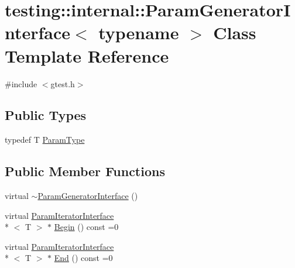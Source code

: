 \hypertarget{classtesting_1_1internal_1_1_param_generator_interface}{\section{testing\-:\-:internal\-:\-:Param\-Generator\-Interface$<$ typename $>$ Class Template Reference}
\label{classtesting_1_1internal_1_1_param_generator_interface}
}


{\ttfamily \#include $<$gtest.\-h$>$}

\subsection*{Public Types}
\begin{DoxyCompactItemize}
\item 
typedef T \hyperlink{classtesting_1_1internal_1_1_param_generator_interface_acda0f17f9a2c528f4e85cae116a4400c}{Param\-Type}
\end{DoxyCompactItemize}
\subsection*{Public Member Functions}
\begin{DoxyCompactItemize}
\item 
virtual \hyperlink{classtesting_1_1internal_1_1_param_generator_interface_a6038a513db081a329d1a0a4c3d32d046}{$\sim$\-Param\-Generator\-Interface} ()
\item 
virtual \hyperlink{classtesting_1_1internal_1_1_param_iterator_interface}{Param\-Iterator\-Interface}\\*
$<$ T $>$ $\ast$ \hyperlink{classtesting_1_1internal_1_1_param_generator_interface_ad1e1e72865b895c1bd5acc27e83a3b0b}{Begin} () const =0
\item 
virtual \hyperlink{classtesting_1_1internal_1_1_param_iterator_interface}{Param\-Iterator\-Interface}\\*
$<$ T $>$ $\ast$ \hyperlink{classtesting_1_1internal_1_1_param_generator_interface_ae82e6fc79efcef1c794ad333ffb5bf80}{End} () const =0
\end{DoxyCompactItemize}


